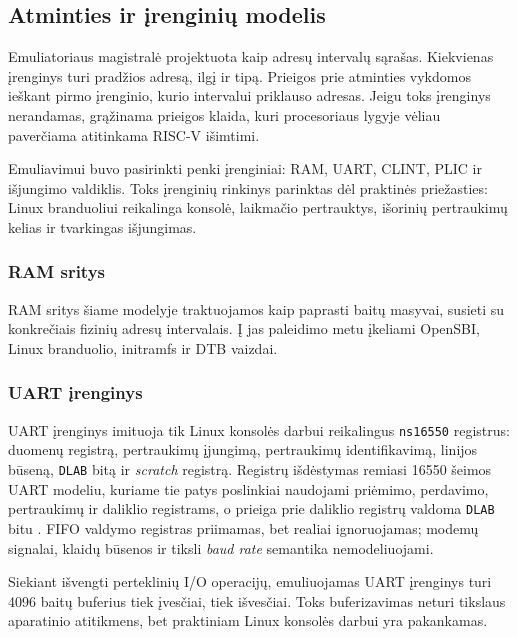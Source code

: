\subsection{Atminties ir įrenginių modelis}
\label{sec:atmintis-ir-irenginiai}

Emuliatoriaus magistralė projektuota kaip adresų intervalų sąrašas. Kiekvienas įrenginys turi pradžios adresą, ilgį ir tipą. Prieigos prie atminties vykdomos ieškant pirmo įrenginio, kurio intervalui priklauso adresas. Jeigu toks įrenginys nerandamas, grąžinama prieigos klaida, kuri procesoriaus lygyje vėliau paverčiama atitinkama RISC-V išimtimi.

Emuliavimui buvo pasirinkti penki įrenginiai: RAM, UART, CLINT, PLIC ir išjungimo valdiklis. Toks įrenginių rinkinys parinktas dėl praktinės priežasties: Linux branduoliui reikalinga konsolė, laikmačio pertrauktys, išorinių pertraukimų kelias ir tvarkingas išjungimas.

\subsubsection{RAM sritys}

RAM sritys šiame modelyje traktuojamos kaip paprasti baitų masyvai, susieti su konkrečiais fizinių adresų intervalais. Į jas paleidimo metu įkeliami OpenSBI, Linux branduolio, initramfs ir DTB vaizdai.

\subsubsection{UART įrenginys}

UART įrenginys imituoja tik Linux konsolės darbui reikalingus \texttt{ns16550} registrus: duomenų registrą, pertraukimų įjungimą, pertraukimų identifikavimą, linijos būseną, \texttt{DLAB} bitą ir \textit{scratch} registrą. Registrų išdėstymas remiasi 16550 šeimos UART modeliu, kuriame tie patys poslinkiai naudojami priėmimo, perdavimo, pertraukimų ir daliklio registrams, o prieiga prie daliklio registrų valdoma \texttt{DLAB} bitu \cite[p.~18--20]{ti-pc16550d}. FIFO valdymo registras priimamas, bet realiai ignoruojamas; modemų signalai, klaidų būsenos ir tiksli \textit{baud rate} semantika nemodeliuojami.

Siekiant išvengti perteklinių I/O operacijų, emuliuojamas UART įrenginys turi 4096 baitų buferius tiek įvesčiai, tiek išvesčiai. Toks buferizavimas neturi tikslaus aparatinio atitikmens, bet praktiniam Linux konsolės darbui yra pakankamas.


